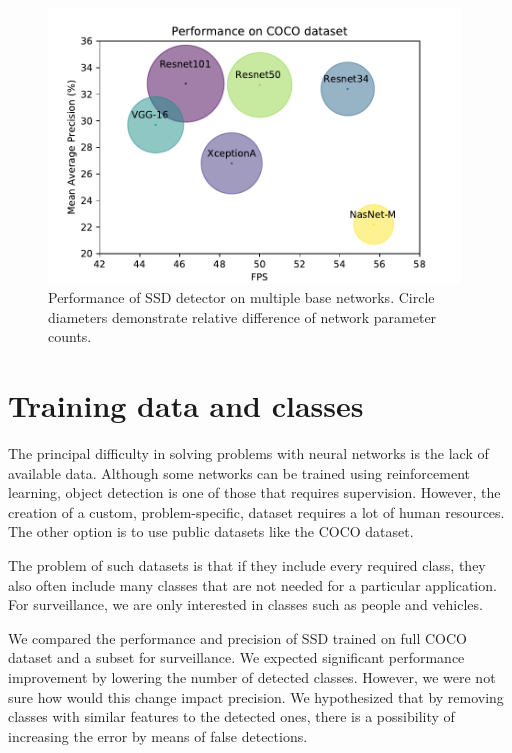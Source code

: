 \begin{figure}
    \centering
    \includegraphics[width=0.975\textwidth]{img/fps_map_c}
    \caption[Performance of SSD with multiple base networks on COCO dataset]{Performance of SSD detector on multiple base networks. Circle diameters demonstrate relative difference of network parameter counts.}
    \label{fig:cocoperf}
\end{figure}

\section{Training data and classes}
The principal difficulty in solving problems with neural networks is the lack of available data. Although some networks can be trained using reinforcement learning, object detection is one of those that requires supervision. However, the creation of a custom, problem-specific, dataset requires a lot of human resources. The other option is to use public datasets like the COCO dataset. 

The problem of such datasets is that if they include every required class, they also often include many classes that are not needed for a particular application. For surveillance, we are only interested in classes such as people and vehicles. 

We compared the performance and precision of SSD trained on full COCO dataset and a subset for surveillance. We expected significant performance improvement by lowering the number of detected classes. However, we were not sure how would this change impact precision. We hypothesized that by removing classes with similar features to the detected ones, there is a possibility of increasing the error by means of false detections.

